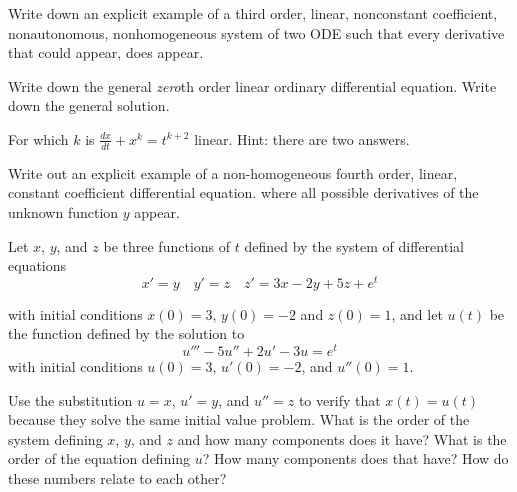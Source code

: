 \documentclass{ximera}
\begin{document}
\begin{exercise}
    Write down an explicit example of a third order, linear, nonconstant coefficient, nonautonomous, nonhomogeneous system of two ODE such that every derivative that could appear, does appear.
\end{exercise}

\begin{exercise}%
    Write down the general \emph{zero}th order linear ordinary differential equation.  Write down the general solution.
\end{exercise}

\begin{exercise}%
    For which $k$ is $\frac{dx}{dt}+x^k = t^{k+2}$ linear.  Hint: there are two answers.
\end{exercise}

\begin{exercise}
    Write out an explicit example of a non-homogeneous fourth order, linear, constant coefficient differential equation. where all possible derivatives of the unknown function $y$ appear. 
\end{exercise}

\begin{exercise}%
    Let $x$, $y$, and $z$ be three functions of $t$ defined by the system of differential equations
    \begin{equation*} 
        x' = y \quad y' = z \quad z' = 3x - 2y + 5z + e^t
    \end{equation*}
    
    with initial conditions $x(0) = 3$, $y(0) = -2$ and $z(0) = 1$, and let $u(t)$ be the function defined by the solution to
    \begin{equation*}
        u''' - 5u'' + 2u' - 3u = e^t
    \end{equation*}
    with initial conditions $u(0) = 3$, $u'(0) = -2$, and $u''(0) = 1$. 
    \begin{tasks}
        \task Use the substitution $u=x$, $u' = y$, and $u'' = z$ to verify that $x(t) = u(t)$ because they solve the same initial value problem.
        \task What is the order of the system defining $x$, $y$, and $z$ and how many components does it have?
        \task What is the order of the equation defining $u$? How many components does that have?
        \task How do these numbers relate to each other?
    \end{tasks}
\end{exercise}
%
\end{document}
